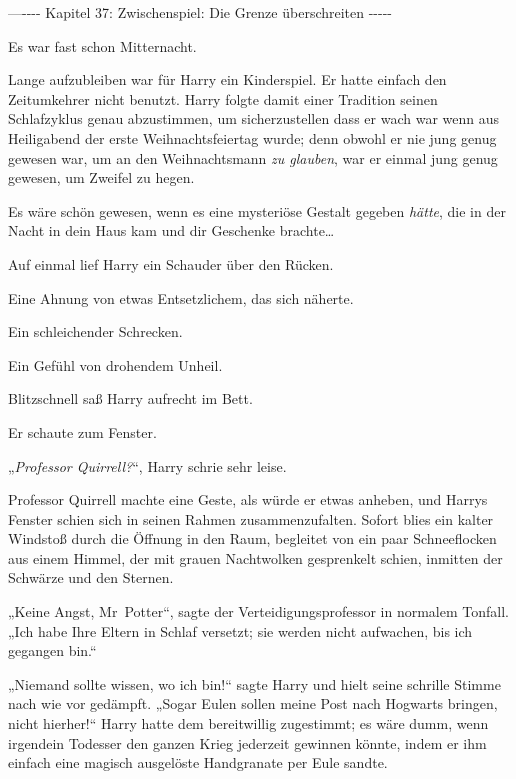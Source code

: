

\hypertarget{zwischenspiel-die-grenze-uxfcberschreiten}{%

—\/-\/-\/-\/- Kapitel 37: Zwischenspiel: Die Grenze überschreiten -\/-\/-\/-\/-

Es war fast schon Mitternacht.

Lange aufzubleiben war für Harry ein Kinderspiel. Er hatte einfach den Zeitumkehrer nicht benutzt. Harry folgte damit einer Tradition seinen Schlafzyklus genau abzustimmen, um sicherzustellen dass er wach war wenn aus Heiligabend der erste Weihnachtsfeiertag wurde; denn obwohl er nie jung genug gewesen war, um an den Weihnachtsmann \emph{zu glauben}, war er einmal jung genug gewesen, um Zweifel zu hegen.

Es wäre schön gewesen, wenn es eine mysteriöse Gestalt gegeben \emph{hätte}, die in der Nacht in dein Haus kam und dir Geschenke brachte…

Auf einmal lief Harry ein Schauder über den Rücken.

Eine Ahnung von etwas Entsetzlichem, das sich näherte.

Ein schleichender Schrecken.

Ein Gefühl von drohendem Unheil.

Blitzschnell saß Harry aufrecht im Bett.

Er schaute zum Fenster.

„\emph{Professor Quirrell?}“, Harry schrie sehr leise.

Professor Quirrell machte eine Geste, als würde er etwas anheben, und Harrys Fenster schien sich in seinen Rahmen zusammenzufalten. Sofort blies ein kalter Windstoß durch die Öffnung in den Raum, begleitet von ein paar Schneeflocken aus einem Himmel, der mit grauen Nachtwolken gesprenkelt schien, inmitten der Schwärze und den Sternen.

„Keine Angst, Mr~Potter“, sagte der Verteidigungsprofessor in normalem Tonfall. „Ich habe Ihre Eltern in Schlaf versetzt; sie werden nicht aufwachen, bis ich gegangen bin.“

„Niemand sollte wissen, wo ich bin!“ sagte Harry und hielt seine schrille Stimme nach wie vor gedämpft. „Sogar Eulen sollen meine Post nach Hogwarts bringen, nicht hierher!“ Harry hatte dem bereitwillig zugestimmt; es wäre dumm, wenn irgendein Todesser den ganzen Krieg jederzeit gewinnen könnte, indem er ihm einfach eine magisch ausgelöste Handgranate per Eule sandte.

}
